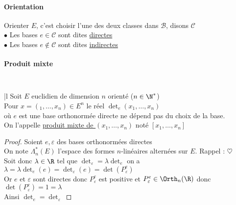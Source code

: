 		\paragraph{Orientation}
			Orienter $E$, c'est choisir l'une des deux classes dans $\mathcal{B}$, disons $\mathcal{C}$\\
			\hspace*{2cm} $\bullet$ Les bases $e\in\mathcal{C}$ sont dites \uline{directes} \\ 
			\hspace*{2cm} $\bullet$ Les bases $e\notin\mathcal{C}$ sont dites \uline{indirectes} \trait ${}$ \vspace*{-1.3cm} \traitd
		\paragraph{Produit mixte} ${}$ \\
		\hspace*{1.5cm} \begin{minipage}{12.71cm} ${}$ \vspace*{0.15cm}\\ \hspace*{0.21cm} \begin{blockarray}{|l} 
		Soit $E$ euclidien de dimension $n$ orienté ($n\in\N^*$)\\
		Pour $x = (_1,\dots ,x_n)\in E^n$ le réel $\det_e (x_1,\dots ,x_n)$ \\où $e$ est une base orthonormée directe ne dépend pas du choix de la base.\\
		On l'appelle \uline{produit mixte de $(x_1,\dots,x_n)$} noté $[x_1,\dots ,x_n]$ \end{blockarray} \end{minipage} 
		\vspace*{-0.1cm} \trait 
		\vspace*{-1.4cm} \begin{proof}
		Soient $e,\varepsilon$ des bases orthonormées directes\\
		On note $\Lambda_n^*(E)$ l'espace des formes $n$-linéaires alternées sur $E$. Rappel :  $\heartsuit$\\
		Soit donc $\lambda \in\R$ tel que $\det_\varepsilon=\lambda\det_e$ on a $\lambda =\lambda \det_e(e) = \det_\varepsilon(e)=\det(P_\varepsilon^e)$\\
		Or $e$ et $\varepsilon$ sont directes donc $P_\varepsilon^e$ est positive et $P_\varepsilon^e\in\Orth_n(\R)$ donc $\det(P_\varepsilon^e)=1=\lambda$\\
		Ainsi $\det_e=\det_\varepsilon$
		\end{proof} ${}$
